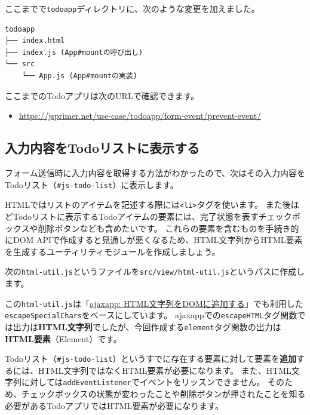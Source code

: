ここまでで\texttt{todoapp}ディレクトリに、次のような変更を加えました。

\begin{lstlisting}
todoapp
├── index.html
├── index.js (App#mountの呼び出し)
└── src
    └── App.js (App#mountの実装)
\end{lstlisting}

ここまでのTodoアプリは次のURLで確認できます。

\begin{itemize}
\item
  \url{https://jsprimer.net/use-case/todoapp/form-event/prevent-event/}
\end{itemize}

\hypertarget{input-to-todolist}{%
\subsection{入力内容をTodoリストに表示する}\label{input-to-todolist}}

フォーム送信時に入力内容を取得する方法がわかったので、次はその入力内容をTodoリスト（\texttt{\#js-todo-list}）に表示します。

HTMLではリストのアイテムを記述する際には\texttt{<li>}タグを使います。
また後ほどTodoリストに表示するTodoアイテムの要素には、完了状態を表すチェックボックスや削除ボタンなども含めたいです。
これらの要素を含むものを手続き的にDOM
APIで作成すると見通しが悪くなるため、HTML文字列からHTML要素を生成するユーティリティモジュールを作成しましょう。

次の\texttt{html-util.js}というファイルを\texttt{src/view/html-util.js}というパスに作成します。

この\texttt{html-util.js}は「\href{../../ajaxapp/display/README.md\#html-to-dom}{ajaxapp:
HTML文字列をDOMに追加する}」でも利用した\texttt{escapeSpecialChars}をベースにしています。
ajaxappでの\texttt{escapeHTML}タグ関数では出力は\textbf{HTML文字列}でしたが、今回作成する\texttt{element}タグ関数の出力は\textbf{HTML要素}（Element）です。

Todoリスト（\texttt{\#js-todo-list}）というすでに存在する要素に対して要素を\textbf{追加}するには、HTML文字列ではなくHTML要素が必要になります。
また、HTML文字列に対しては\texttt{addEventListener}でイベントをリッスンできません。
そのため、チェックボックスの状態が変わったことや削除ボタンが押されたことを知る必要があるTodoアプリではHTML要素が必要になります。

